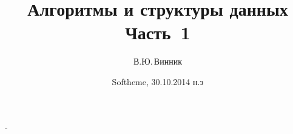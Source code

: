 \documentclass[landscape]{slides}
\begin{document}
\author{В.Ю.\,Винник}

\title{Алгоритмы и структуры данных\\
Часть~1}

\date{Softheme, 30.10.2014 н.э}

\maketitle

\begin{slide}
-
\end{slide}
\end{document}
